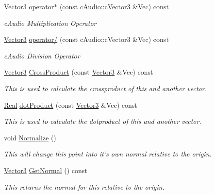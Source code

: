 \begin{DoxyCompactItemize}
\hyperlink{classphys_1_1Vector3}{Vector3} \hyperlink{classphys_1_1Vector3_a8bfb89d47b4aceed530fe81202c6f368}{operator$\ast$} (const cAudio::cVector3 \&Vec) const 
\begin{DoxyCompactList}\small\item\em cAudio Multiplication Operator \item\end{DoxyCompactList}\item 
\hyperlink{classphys_1_1Vector3}{Vector3} \hyperlink{classphys_1_1Vector3_ad2e1c9f24ea2127380e772058a91130c}{operator/} (const cAudio::cVector3 \&Vec) const 
\begin{DoxyCompactList}\small\item\em cAudio Division Operator \item\end{DoxyCompactList}\item 
\hyperlink{classphys_1_1Vector3}{Vector3} \hyperlink{classphys_1_1Vector3_ad9f0c1eee59e8a0d221eca49f49e0970}{CrossProduct} (const \hyperlink{classphys_1_1Vector3}{Vector3} \&Vec) const 
\begin{DoxyCompactList}\small\item\em This is used to calculate the crossproduct of this and another vector. \item\end{DoxyCompactList}\item 
\hyperlink{namespacephys_af7eb897198d265b8e868f45240230d5f}{Real} \hyperlink{classphys_1_1Vector3_a5d01476fddf832b4f49a3dcda8cdfb9b}{dotProduct} (const \hyperlink{classphys_1_1Vector3}{Vector3} \&Vec) const 
\begin{DoxyCompactList}\small\item\em This is used to calculate the dotproduct of this and another vector. \item\end{DoxyCompactList}\item 
void \hyperlink{classphys_1_1Vector3_ae39fe0545df88148bcd668b3bd2a4388}{Normalize} ()
\begin{DoxyCompactList}\small\item\em This will change this point into it's own normal relative to the origin. \item\end{DoxyCompactList}\item 
\hyperlink{classphys_1_1Vector3}{Vector3} \hyperlink{classphys_1_1Vector3_a81e11f45378758391c97ec55b519951c}{GetNormal} () const 
\begin{DoxyCompactList}\small\item\em This returns the normal for this relative to the origin. \item\end{DoxyCompactList}\item 

\end{DoxyCompactItemize}
